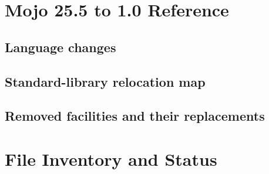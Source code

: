\documentclass[11pt,a4paper]{report}
\begin{document}
\appendix

\chapter{Mojo 25.5 to 1.0 Reference}
\section{Language changes}
\section{Standard-library relocation map}
\section{Removed facilities and their replacements}

\chapter{File Inventory and Status}
\end{document}

